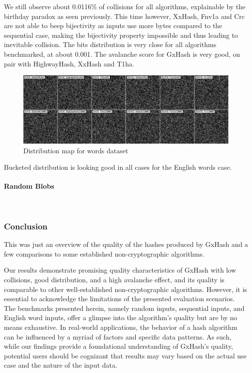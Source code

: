 \documentclass[10pt]{article}
\begin{document}
We still observe about 0.0116\% of collisions for all algorithms, explainable by the birthday paradox as seen previously. This time however, XxHash\cite{xxhash}, Fnv1a and Crc are not able to beep bijectivity as inputs use more bytes compared to the sequential case, making the bijectivity property impossible and thus leading to inevitable collision.
The bits distribution is very close for all algorithms benchmarked, at about 0.001. The avalanche score for GxHash is very good, on pair with HighwayHash\cite{highwayhash}, XxHash\cite{xxhash} and T1ha\cite{rust-t1ha}.

\begin{figure}[H]
\centering
\includegraphics[width=1\textwidth]{quality-markov.png}
\caption{Distribution map for words dataset}
\label{fig:quality-sequential}
\end{figure}

Bucketed distribution is looking good in all cases for the English words case.

\paragraph{Random Blobs}\leavevmode\\

\subsubsection{Conclusion}

This was just an overview of the quality of the hashes produced by GxHash and a few comparisons to some established non-cryptographic algorithms. 

Our results demonstrate promising quality characteristics of GxHash with low collisions, good distribution, and a high avalanche effect, and its quality is comparable to other well-established non-cryptographic algorithms. However, it is essential to acknowledge the limitations of the presented evaluation scenarios. The benchmarks presented herein, namely random inputs, sequential inputs, and English word inputs, offer a glimpse into the algorithm's quality but are by no means exhaustive. In real-world applications, the behavior of a hash algorithm can be influenced by a myriad of factors and specific data patterns. As such, while our findings provide a foundational understanding of GxHash's quality, potential users should be cognizant that results may vary based on the actual use case and the nature of the input data.
\end{document}
